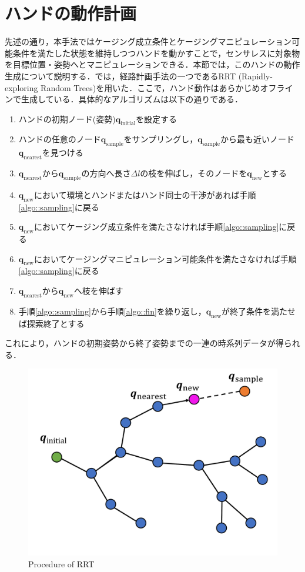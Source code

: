 \documentclass[a4paper,twoside,12pt,papersize, dvipdfmx]{iirthesis}
\begin{document}
\section{ハンドの動作計画\cite{komiyama2021}}\label{sec::sicm::planning}
先述の通り，本手法ではケージング成立条件とケージングマニピュレーション可能条件を満たした状態を維持しつつハンドを動かすことで，センサレスに対象物を目標位置・姿勢へとマニピュレーションできる．本節では，このハンドの動作生成について説明する．\cite{komiyama2021}では，経路計画手法の一つであるRRT (Rapidly-exploring Random Trees)\cite{lavalle2001}を用いた．ここで，ハンド動作はあらかじめオフラインで生成している．具体的なアルゴリズムは以下の通りである．
\begin{enumerate}
\item ハンドの初期ノード(姿勢)$\bm{q}_{\mathrm{initial}}$を設定する
\item ハンドの任意のノード$\bm{q}_{\mathrm{sample}}$をサンプリングし，$\bm{q}_{\mathrm{sample}}$から最も近いノード$\bm{q}_{\mathrm{nearest}}$を見つける\label{algo::sampling}
\item $\bm{q}_{\mathrm{nearest}}$から$\bm{q}_{\mathrm{sample}}$の方向へ長さ$\Delta l$の枝を伸ばし，そのノードを$\bm{q}_{\mathrm{new}}$とする
\item $\bm{q}_{\mathrm{new}}$において環境とハンドまたはハンド同士の干渉があれば手順\ref{algo::sampling}に戻る
\item $\bm{q}_{\mathrm{new}}$においてケージング成立条件を満たさなければ手順\ref{algo::sampling}に戻る
\item $\bm{q}_{\mathrm{new}}$においてケージングマニピュレーション可能条件を満たさなければ手順\ref{algo::sampling}に戻る
\item $\bm{q}_{\mathrm{nearest}}$から$\bm{q}_{\mathrm{new}}$へ枝を伸ばす\label{algo::fin}
\item 手順\ref{algo::sampling}から手順\ref{algo::fin}を繰り返し，$\bm{q}_{\mathrm{new}}$が終了条件を満たせば探索終了とする \label{algo::goal}
\end{enumerate}
これにより，ハンドの初期姿勢から終了姿勢までの一連の時系列データが得られる．
\begin{figure}[b]
\centering
\includegraphics[width=0.5\hsize]{fig/2-sensorless-icm/rrtdiagram.pdf}
\caption{Procedure of RRT \cite{komiyama2021}}
\label{fig::sicm::rrt}
\end{figure}
\end{document}
